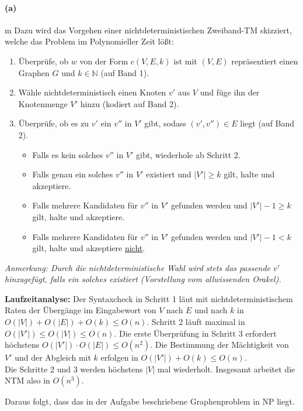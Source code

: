 
\paragraph{(a)}m 
	Dazu wird das Vorgehen einer nichtdeterministischen Zweiband-TM skizziert, welche das Problem im Polynomieller Zeit lößt:
	\begin{enumerate}
		\item Überprüfe, ob $w$ von der Form $c(V,E,k)$ ist mit $(V,E)$ repräsentiert einen Graphen $G$ und $k \in \mathbb{N}$ (auf Band 1).
		\item Wähle nichtdeterministisch einen Knoten $v'$ aus $V$ und füge ihn der Knotenmenge $V'$ hinzu (kodiert auf Band 2).
		\item Überprüfe, ob es zu $v'$ ein $v''$ in $V'$ gibt, sodass $(v',v'')\in E$ liegt (auf Band 2). \begin{itemize}
			\item Falls es kein solches $v''$ in $V'$ gibt, wiederhole ab Schritt 2.
			\item Falls genau ein solches $v''$ in $V'$ existiert und $|V'|\geq k$ gilt, halte und akzeptiere.
			\item Falls mehrere Kandidaten für $v''$ in $V'$ gefunden werden und $|V'|-1\geq k$ gilt, halte und akzeptiere.
			\item Falls mehrere Kandidaten für $v''$ in $V'$ gefunden werden und $|V'|-1 < k$ gilt, halte und akzeptiere \underline{nicht}.
		\end{itemize}
	\end{enumerate}
	\textit{Anmerkung: Durch die nichtdeterministische Wahl wird stets das passende $v'$ hinzugefügt, falls ein solches existiert (Vorstellung vom allwissenden Orakel).}

	\textbf{Laufzeitanalyse:} Der Syntaxcheck in Schritt 1 läut mit nichtdeterministischem Raten der Übergänge im Eingabewort von $V$ nach $E$ und nach $k$ in $O(|V|)+O(|E|)+O(k)\leq O(n)$. Schritt 2 läuft maximal in $O(|V'|)\leq O(|V|)\leq O(n)$. Die erste Überprüfung in Schritt 3 erfordert höchstens $O(|V'|)\cdot O(|E|)\leq O(n^2)$. Die Bestimmung der Mächtigkeit von $V'$ und der Abgleich mit $k$ erfolgen in $O(|V'|)+O(k)\leq O(n)$.\\
	Die Schritte 2 und 3 werden höchstens $|V|$ mal wiederholt. Insgesamt arbeitet die NTM also in $O(n^3)$.

	Daraus folgt, dass das in der Aufgabe beschriebene Graphenproblem in NP liegt.

